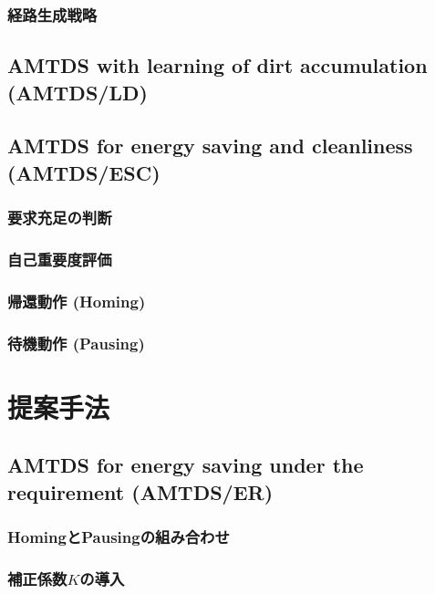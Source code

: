 \documentclass[12pt,a4j,twoside]{jarticle}
\begin{document}
\subsubsection{経路生成戦略}
  \label{route_strategy}
  
  \subsection{AMTDS with learning of dirt accumulation (AMTDS/LD)}
  
  \subsection{AMTDS for energy saving and cleanliness (AMTDS/ESC)}
  
  \subsubsection{要求充足の判断}
 
  \subsubsection{自己重要度評価}
  
  \subsubsection{帰還動作 (Homing)}
  
  \subsubsection{待機動作 (Pausing)}
  
  \section{提案手法}
  
  \subsection{AMTDS for energy saving under the requirement (AMTDS/ER)}
  
  \subsubsection{HomingとPausingの組み合わせ}
  
  \subsubsection{補正係数$K$の導入}
  
\end{document}
